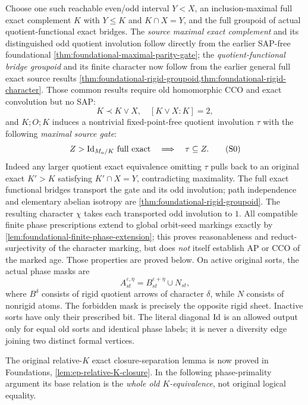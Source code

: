 Choose one such reachable even/odd interval
\(Y<X\), an inclusion-maximal full exact
complement \(K\) with \(Y\le K\) and
\(K\cap X=Y\), and the full groupoid of
actual quotient-functional exact bridges.
The \emph{source maximal exact complement} and
its distinguished odd quotient involution follow
directly from the earlier SAP-free foundational
\cref{thm:foundational-maximal-parity-gate}; the
\emph{quotient-functional bridge groupoid}
and its finite character now follow from
the earlier general full exact source results
\cref{thm:foundational-rigid-groupoid,thm:foundational-rigid-character}.
Those common results require old homomorphic
CCO and exact convolution but no SAP:
\[
  K\prec K\vee X,\quad [K\vee X:K]=2,
\]
and \(K;O;K\) induces a nontrivial
fixed-point-free quotient involution
\(\tau\) with the following
\emph{maximal source gate}:
\[
 Z>\mathrm{Id}_{M_a/K}\text{ full exact}
          \quad\Longrightarrow\quad \tau\subseteq Z.
 \tag{S0}\label{eq:ep-ap-source-gate}
\]
Indeed any larger quotient exact equivalence
omitting \(\tau\) pulls back to an original
exact \(K'>K\) satisfying
\(K'\cap X=Y\), contradicting maximality.
The full exact functional bridges transport
the gate and its odd involution; path
independence and elementary abelian
isotropy are
\cref{thm:foundational-rigid-groupoid}.
The resulting character \(\chi\) takes
each transported odd involution to \(1\).
All compatible finite phase prescriptions
extend to global orbit-seed markings
exactly by
\cref{lem:foundational-finite-phase-extension};
this proves reasonableness and
reduct-surjectivity of the character
marking, but does \emph{not} itself
establish AP or CCO of the marked age.
Those properties are proved below.
On active
original sorts, the actual phase masks are
\[
 A_{st}^{\varepsilon,\eta}
    =B_{st}^{\varepsilon+\eta}\cup N_{st},
 \tag{S1}\label{eq:ep-ap-mask}
\]
where \(B^\delta\) consists of rigid quotient arrows
of character \(\delta\), while \(N\) consists of
nonrigid atoms. The forbidden mask is precisely
the opposite rigid sheet. Inactive sorts have
only their prescribed bit. The literal diagonal
\(\mathrm{Id}\) is an allowed output only for
equal old sorts and identical phase labels;
it is never a diversity edge joining two
distinct formal vertices.

The original relative-$K$ exact closure-separation lemma is now proved
in Foundations, \cref{lem:ep-relative-K-closure}. In the following
phase-primality argument its base relation is the \emph{whole old
$K$-equivalence}, not original logical equality.

